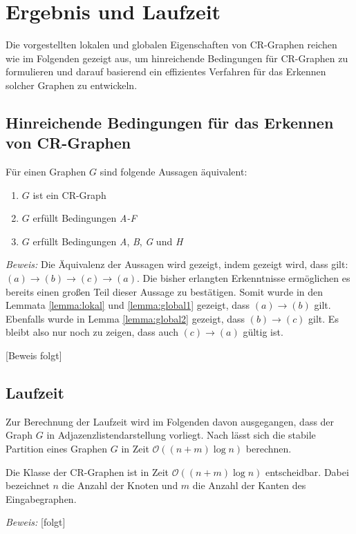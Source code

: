 \section{Ergebnis und Laufzeit}
\label{sec/ergebnis}


Die vorgestellten lokalen und globalen Eigenschaften von CR-Graphen reichen wie im Folgenden gezeigt aus, um hinreichende Bedingungen für CR-Graphen zu formulieren und darauf basierend ein effizientes Verfahren für das Erkennen solcher Graphen zu entwickeln.

\subsection{Hinreichende Bedingungen für das Erkennen von CR-Graphen}
\begin{Theorem}
	Für einen Graphen $G$ sind folgende Aussagen äquivalent:
	
	\begin{enumerate}[label=(\alph*)]
		\item $G$ ist ein CR-Graph
		\item $G$ erfüllt Bedingungen \emph{A-F}
		\item $G$ erfüllt Bedingungen \emph{A}, \emph{B}, \emph{G} und \emph{H}
	\end{enumerate}
\end{Theorem}

\emph{Beweis:} Die Äquivalenz der Aussagen wird gezeigt, indem gezeigt wird, dass gilt: $(a)\rightarrow (b)\rightarrow (c)\rightarrow (a)$.
Die bisher erlangten Erkenntnisse ermöglichen es bereits einen großen Teil dieser Aussage zu bestätigen. Somit wurde in den Lemmata \ref{lemma:lokal} und \ref{lemma:global1} gezeigt, dass $(a)\rightarrow (b)$ gilt. Ebenfalls wurde in Lemma \ref{lemma:global2} gezeigt, dass $(b)\rightarrow (c)$ gilt. Es bleibt also nur noch zu zeigen, dass auch $(c)\rightarrow (a)$ gültig ist.

[Beweis folgt]

\subsection{Laufzeit}
Zur Berechnung der Laufzeit wird im Folgenden davon ausgegangen, dass der Graph $G$ in Adjazenzlistendarstellung vorliegt.
Nach \cite{CARDON198285} lässt sich die stabile Partition eines Graphen $G$ in Zeit $\mathcal{O}((n+m)\log n)$ berechnen.

\begin{Theorem}
	Die Klasse der CR-Graphen ist in Zeit $\mathcal{O}((n+m)\log n)$ entscheidbar. Dabei bezeichnet $n$ die Anzahl der Knoten und $m$ die Anzahl der Kanten des Eingabegraphen.
\end{Theorem}

\emph{Beweis:} [folgt]